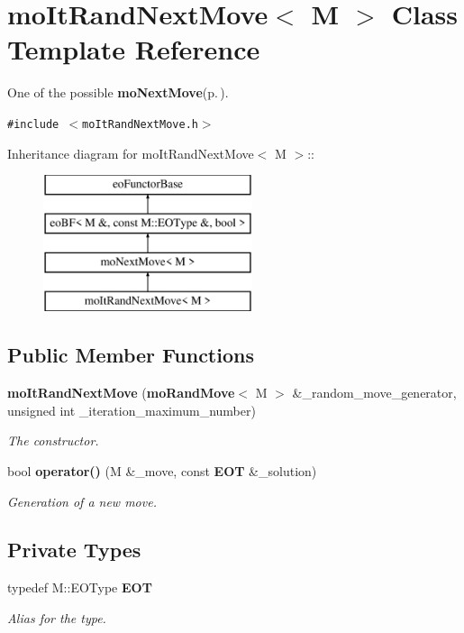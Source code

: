\section{mo\-It\-Rand\-Next\-Move$<$ M $>$ Class Template Reference}
\label{classmo_it_rand_next_move}
One of the possible {\bf mo\-Next\-Move}{\rm (p.\,\pageref{classmo_next_move})}.  


{\tt \#include $<$mo\-It\-Rand\-Next\-Move.h$>$}

Inheritance diagram for mo\-It\-Rand\-Next\-Move$<$ M $>$::\begin{figure}[H]
\begin{center}
\leavevmode
\includegraphics[height=4cm]{classmo_it_rand_next_move}
\end{center}
\end{figure}
\subsection*{Public Member Functions}
\begin{CompactItemize}
\item 
{\bf mo\-It\-Rand\-Next\-Move} ({\bf mo\-Rand\-Move}$<$ M $>$ \&\_\-random\_\-move\_\-generator, unsigned int \_\-iteration\_\-maximum\_\-number)
\begin{CompactList}\small\item\em The constructor. \item\end{CompactList}\item 
bool {\bf operator()} (M \&\_\-move, const {\bf EOT} \&\_\-solution)
\begin{CompactList}\small\item\em Generation of a new move. \item\end{CompactList}\end{CompactItemize}
\subsection*{Private Types}
\begin{CompactItemize}
\item 
typedef M::EOType {\bf EOT}\label{classmo_it_rand_next_move_y0}

\begin{CompactList}\small\item\em Alias for the type. \item\end{CompactList}\end{CompactItemize}
